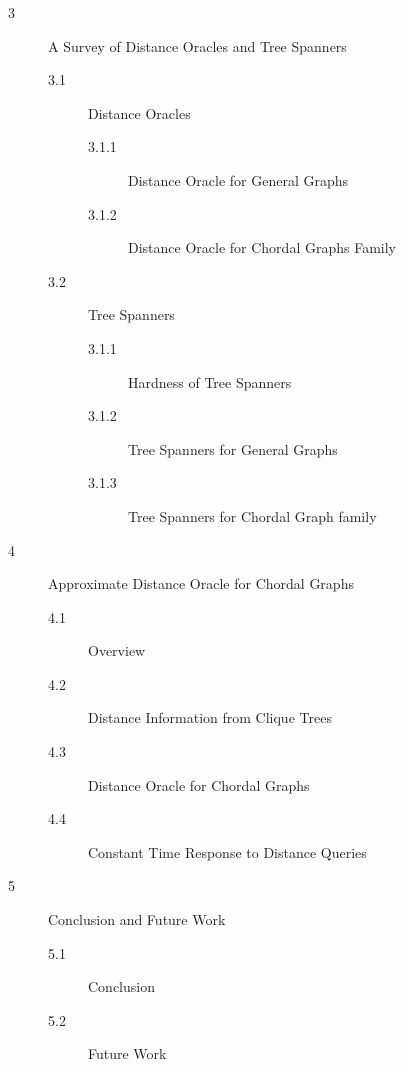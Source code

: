 \begin{description}
  \item[3] A Survey of Distance Oracles and Tree Spanners
           \begin{description}
              \item[3.1] Distance Oracles
                   \begin{description}
                    \item[3.1.1] Distance Oracle for General Graphs
                    \item[3.1.2] Distance Oracle for Chordal Graphs Family
                   \end{description}
              \item[3.2] Tree Spanners
                   \begin{description}
                    \item[3.1.1] Hardness of Tree Spanners
                    \item[3.1.2] Tree Spanners for General Graphs
                    \item[3.1.3] Tree Spanners for Chordal Graph family
                   \end{description}
           \end{description}


 \item[4] Approximate Distance Oracle for Chordal Graphs
            \begin{description}
               \item[4.1] Overview
               \item[4.2] Distance Information from Clique Trees
               \item[4.3] Distance Oracle for Chordal Graphs
               \item[4.4] Constant Time Response to Distance Queries
            \end{description}


 \item[5] Conclusion and Future Work
            \begin{description}
               \item[5.1] Conclusion
               \item[5.2] Future Work
            \end{description}


\end{description}


